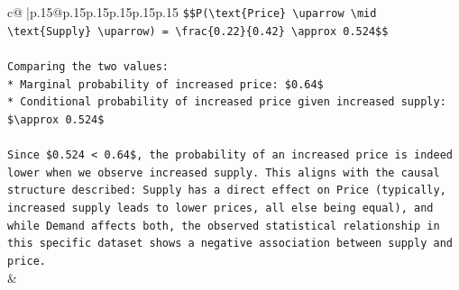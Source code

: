 \documentclass{article}
\begin{document}
{\begin{supertabular}{c@{$\;$}|p{.15\linewidth}@{}p{.15\linewidth}p{.15\linewidth}p{.15\linewidth}p{.15\linewidth}p{.15\linewidth}}
{{{\texttt{\$\$P(\textbackslash{}text\{Price\} \textbackslash{}uparrow \textbackslash{}mid \textbackslash{}text\{Supply\} \textbackslash{}uparrow) = \textbackslash{}frac\{0.22\}\{0.42\} \textbackslash{}approx 0.524\$\$} \\
\\ 
\texttt{Comparing the two values:} \\
\texttt{*   Marginal probability of increased price: \$0.64\$} \\
\texttt{*   Conditional probability of increased price given increased supply: \$\textbackslash{}approx 0.524\$} \\
\\ 
\texttt{Since \$0.524 < 0.64\$, the probability of an increased price is indeed lower when we observe increased supply. This aligns with the causal structure described: Supply has a direct effect on Price (typically, increased supply leads to lower prices, all else being equal), and while Demand affects both, the observed statistical relationship in this specific dataset shows a negative association between supply and price.} \\
            }
        }
    }
    & \\ \\


\end{supertabular}}
\end{document}
